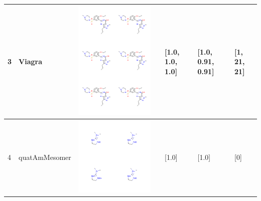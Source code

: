 \begin{longtable}{|l|l|l|l|l|l|l|}
3 & Viagra & \includegraphics[scale=0.6]{ViagraCA.png} & & [1.0, 1.0, 1.0]& [1.0, 0.91, 0.91] & [1, 21, 21] \\
\hline
4 & quatAmMesomer & \includegraphics[scale=0.6]{quatAmMesomerCA.png} & & [1.0]& [1.0] & [0] \\

\end{longtable}
